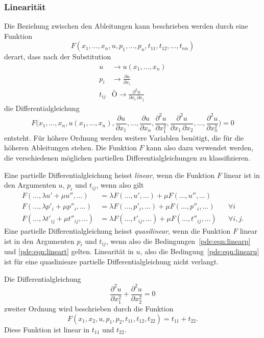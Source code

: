 \subsubsection{Linearität}
Die Beziehung zwischen den Ableitungen kann beschrieben werden durch
eine Funktion
\[
F(x_1,\dots,x_n,u,p_1,\dots,p_n,t_{11},t_{12},\dots,t_{nn})
\]
derart, dass nach der Substitution
\begin{align*}
u&\to u(x_1,\dots,x_n)
\\
p_i&\to \frac{\partial u}{\partial x_i}
\\
t_{ij} &Ò\to \frac{\partial^2 u}{\partial x_i\,\partial x_j}
\end{align*}
die Differentialgleichung
\[
F\biggl(
x_1,\dots,x_n,u(x_1,\dots,x_n),
\frac{\partial u}{\partial x_1},\dots,\frac{\partial u}{\partial x_n},
\frac{\partial^2u}{\partial x_1^2},
\frac{\partial^2u}{\partial x_1\,\partial x_2},\dots,
\frac{\partial^2u}{\partial x_n^2}
\biggr)
=0
\]
entsteht.
Für höhere Ordnung werden weitere Variablen benötigt, die für die
höheren Ableitungen stehen.
Die Funktion $F$ kann also dazu verwendet werden, die verschiedenen
möglichen partiellen Differentialgleichungen zu klassifizieren.

Eine partielle Differentialgleichung heisst {\em linear}, wenn die
Funktion $F$ linear ist in den Argumenten $u$, $p_i$ und $t_{ij}$,
wenn also gilt
\begin{align}
F(\dots,\lambda u' + \mu u'',\dots)
&=
\lambda F(\dots,u',\dots) + \mu F(\dots,u'',\dots)
\label{pde:eqn:linearu}
\\
F(\dots,\lambda p'_i+\mu p''_i,\dots)
&=
\lambda F(\dots,p'_i,\dots) + \mu F(\dots,p''_i,\dots)
&&\forall i
\label{pde:eqn:linearp}
\\
F(\dots,\lambda t'_{ij}+\mu t''_{ij},\dots)
&=
\lambda F(\dots,t'_{ij},\dots) + \mu F(\dots,t''_{ij},\dots)
&&\forall i,j.
\label{pde:eqn:lineart}
\end{align}
Eine partielle Differentialgleichung heisst {\em quasilinear}, 
wenn die Funktion $F$ linear ist in den Argumenten $p_i$ und $t_{ij}$,
wenn also die Bedingungen~\eqref{pde:eqn:linearp} und \eqref{pde:eqn:lineart}
gelten.
Linearität in $u$, also die Bedingung~\eqref{pde:eqn:linearu} ist
für eine quaslinieare partielle Differentialgleichung nicht verlangt.

\begin{beispiel}
Die Differentialgleichung
\[
\frac{\partial^2 u}{\partial x_1^2}
+
\frac{\partial^2 u}{\partial x_2^2}
=
0
\]
zweiter Ordnung wird beschrieben durch die Funktion
\[
F(x_1,x_2,u,p_1,p_2,t_{11},t_{12},t_{22})
=
t_{11} + t_{22}.
\]
Diese Funktion ist linear in $t_{11}$ und $t_{22}$.
\end{beispiel}

